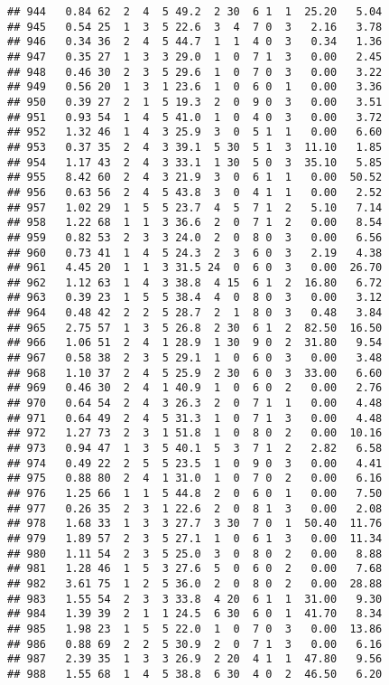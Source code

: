 \documentclass[
]{article}
\begin{document}
\begin{verbatim}
## 944   0.84 62  2  4  5 49.2  2 30  6 1  1  25.20   5.04
## 945   0.54 25  1  3  5 22.6  3  4  7 0  3   2.16   3.78
## 946   0.34 36  2  4  5 44.7  1  1  4 0  3   0.34   1.36
## 947   0.35 27  1  3  3 29.0  1  0  7 1  3   0.00   2.45
## 948   0.46 30  2  3  5 29.6  1  0  7 0  3   0.00   3.22
## 949   0.56 20  1  3  1 23.6  1  0  6 0  1   0.00   3.36
## 950   0.39 27  2  1  5 19.3  2  0  9 0  3   0.00   3.51
## 951   0.93 54  1  4  5 41.0  1  0  4 0  3   0.00   3.72
## 952   1.32 46  1  4  3 25.9  3  0  5 1  1   0.00   6.60
## 953   0.37 35  2  4  3 39.1  5 30  5 1  3  11.10   1.85
## 954   1.17 43  2  4  3 33.1  1 30  5 0  3  35.10   5.85
## 955   8.42 60  2  4  3 21.9  3  0  6 1  1   0.00  50.52
## 956   0.63 56  2  4  5 43.8  3  0  4 1  1   0.00   2.52
## 957   1.02 29  1  5  5 23.7  4  5  7 1  2   5.10   7.14
## 958   1.22 68  1  1  3 36.6  2  0  7 1  2   0.00   8.54
## 959   0.82 53  2  3  3 24.0  2  0  8 0  3   0.00   6.56
## 960   0.73 41  1  4  5 24.3  2  3  6 0  3   2.19   4.38
## 961   4.45 20  1  1  3 31.5 24  0  6 0  3   0.00  26.70
## 962   1.12 63  1  4  3 38.8  4 15  6 1  2  16.80   6.72
## 963   0.39 23  1  5  5 38.4  4  0  8 0  3   0.00   3.12
## 964   0.48 42  2  2  5 28.7  2  1  8 0  3   0.48   3.84
## 965   2.75 57  1  3  5 26.8  2 30  6 1  2  82.50  16.50
## 966   1.06 51  2  4  1 28.9  1 30  9 0  2  31.80   9.54
## 967   0.58 38  2  3  5 29.1  1  0  6 0  3   0.00   3.48
## 968   1.10 37  2  4  5 25.9  2 30  6 0  3  33.00   6.60
## 969   0.46 30  2  4  1 40.9  1  0  6 0  2   0.00   2.76
## 970   0.64 54  2  4  3 26.3  2  0  7 1  1   0.00   4.48
## 971   0.64 49  2  4  5 31.3  1  0  7 1  3   0.00   4.48
## 972   1.27 73  2  3  1 51.8  1  0  8 0  2   0.00  10.16
## 973   0.94 47  1  3  5 40.1  5  3  7 1  2   2.82   6.58
## 974   0.49 22  2  5  5 23.5  1  0  9 0  3   0.00   4.41
## 975   0.88 80  2  4  1 31.0  1  0  7 0  2   0.00   6.16
## 976   1.25 66  1  1  5 44.8  2  0  6 0  1   0.00   7.50
## 977   0.26 35  2  3  1 22.6  2  0  8 1  3   0.00   2.08
## 978   1.68 33  1  3  3 27.7  3 30  7 0  1  50.40  11.76
## 979   1.89 57  2  3  5 27.1  1  0  6 1  3   0.00  11.34
## 980   1.11 54  2  3  5 25.0  3  0  8 0  2   0.00   8.88
## 981   1.28 46  1  5  3 27.6  5  0  6 0  2   0.00   7.68
## 982   3.61 75  1  2  5 36.0  2  0  8 0  2   0.00  28.88
## 983   1.55 54  2  3  3 33.8  4 20  6 1  1  31.00   9.30
## 984   1.39 39  2  1  1 24.5  6 30  6 0  1  41.70   8.34
## 985   1.98 23  1  5  5 22.0  1  0  7 0  3   0.00  13.86
## 986   0.88 69  2  2  5 30.9  2  0  7 1  3   0.00   6.16
## 987   2.39 35  1  3  3 26.9  2 20  4 1  1  47.80   9.56
## 988   1.55 68  1  4  5 38.8  6 30  4 0  2  46.50   6.20

\end{verbatim}
\end{document}
